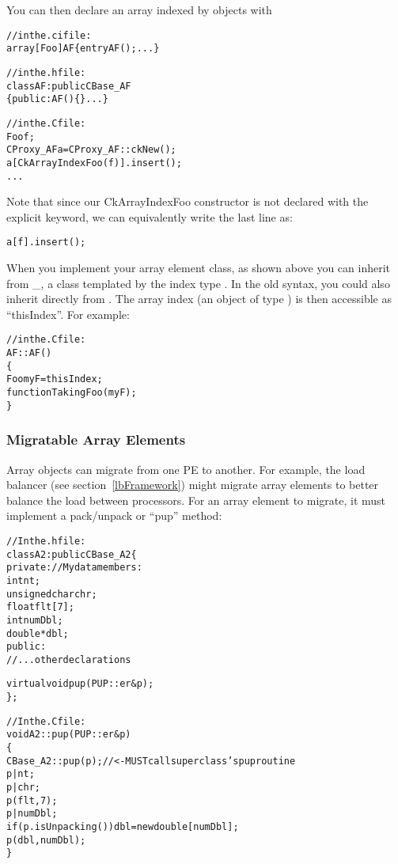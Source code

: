 You can then declare an array indexed by  objects with

\begin{alltt}
//in the .ci file:
array [Foo] AF \{ entry AF(); ... \}

//in the .h file:
class AF : public CBase\_AF
\{ public: AF() \{\} ... \}

//in the .C file:
    Foo f;
    CProxy_AF a=CProxy_AF::ckNew();
    a[CkArrayIndexFoo(f)].insert();
    ...
\end{alltt}

Note that since our CkArrayIndexFoo constructor is not declared
with the explicit keyword, we can equivalently write the last line as:

\begin{alltt}
    a[f].insert();
\end{alltt}

When you implement your array element class, as shown above you 
can inherit from \_, 
a class templated by the index type . In the old syntax,
you could also inherit directly from .
The array index (an object of type ) is then accessible as 
``thisIndex''. For example:

\begin{alltt}

//in the .C file:
AF::AF()
\{
    Foo myF=thisIndex;
    functionTakingFoo(myF);
\}
\end{alltt}


\subsubsection{Migratable Array Elements}

\label{arraymigratable}
Array objects can migrate from one PE to another.
For example, the load balancer (see section~\ref{lbFramework})
might migrate array elements to better balance the load between
processors.  For an array element to migrate, it must implement
a pack/unpack or ``pup'' method:

\begin{alltt}
//In the .h file:
class A2 : public CBase\_A2 \{
private: //My data members:
    int nt;
    unsigned char chr;
    float flt[7];
    int numDbl;
    double *dbl;
public:	
    //...other declarations

    virtual void pup(PUP::er \&p);
\};

//In the .C file:
void A2::pup(PUP::er \&p)
\{
    CBase\_A2::pup(p); //<- MUST call superclass's pup routine
    p|nt;
    p|chr;
    p(flt,7);
    p|numDbl;
    if (p.isUnpacking()) dbl=new double[numDbl];
    p(dbl,numDbl);
\}
\end{alltt}

